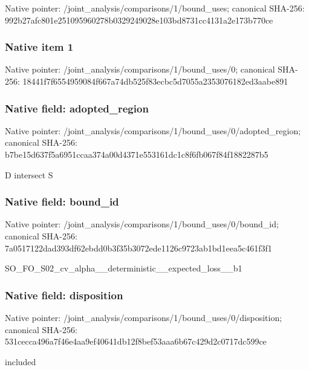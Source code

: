 \documentclass[10pt,a4paper]{article}
\begin{document}
Native pointer: /joint\_analysis/comparis\allowbreak{}ons/1/bound\_uses; canonical SHA-256: 992b27afc801e25109596027\allowbreak{}8b0329249028e103bd8731cc\allowbreak{}4131a2e173b770ce



\subsubsection{Native item 1}


Native pointer: /joint\_analysis/comparis\allowbreak{}ons/1/bound\_uses/0; canonical SHA-256: 18441f7f6554959084f667a7\allowbreak{}4db525f83ecbc5d7055a2353\allowbreak{}076182ed3aabe891



\subsubsection{Native field: adopted\_region}


Native pointer: /joint\_analysis/comparis\allowbreak{}ons/1/bound\_uses/0/adopt\allowbreak{}ed\_region; canonical SHA-256: b7be15d637f5a6951ccaa374\allowbreak{}a00d4371e553161dc1c8f6fb\allowbreak{}067f84f1882287b5


D intersect S


\subsubsection{Native field: bound\_id}


Native pointer: /joint\_analysis/comparis\allowbreak{}ons/1/bound\_uses/0/bound\allowbreak{}\_id; canonical SHA-256: 7a0517122dad393df62ebdd0\allowbreak{}b3f35b3072ede1126c9723ab\allowbreak{}1bd1eea5c461f3f1


SO\_FO\_S02\_cv\_alpha\_\_dete\allowbreak{}rministic\_\_expected\_loss\allowbreak{}\_\_b1


\subsubsection{Native field: disposition}


Native pointer: /joint\_analysis/comparis\allowbreak{}ons/1/bound\_uses/0/dispo\allowbreak{}sition; canonical SHA-256: 531cecca496a7f46e4aa9ef4\allowbreak{}0641db12f8bef53aaa6b67c4\allowbreak{}29d2c0717dc599ce


included
\end{document}
